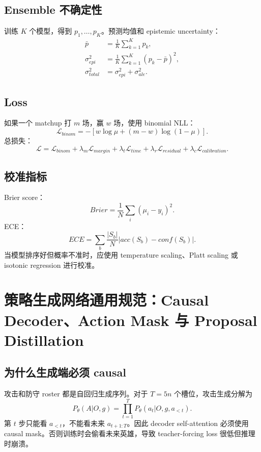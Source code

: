 \documentclass[UTF8,12pt,openany]{ctexbook}
\begin{document}
\section{Ensemble 不确定性}
训练 $K$ 个模型，得到 $p_1,\ldots,p_K$。预测均值和 epistemic uncertainty：
\begin{align}
\bar p&=\frac{1}{K}\sum_{k=1}^{K}p_k,\\
\sigma^2_{epi}&=\frac{1}{K}\sum_{k=1}^{K}(p_k-\bar p)^2,\\
\sigma^2_{total}&=\sigma^2_{epi}+\sigma^2_{ale}.
\end{align}

\section{Loss}
如果一个 matchup 打 $m$ 场，赢 $w$ 场，使用 binomial NLL：
\begin{equation}
\mathcal{L}_{binom}= -[w\log\mu+(m-w)\log(1-\mu)].
\end{equation}
总损失：
\begin{equation}
\mathcal{L}=\mathcal{L}_{binom}+\lambda_m\mathcal{L}_{margin}+\lambda_t\mathcal{L}_{time}+\lambda_r\mathcal{L}_{residual}+\lambda_c\mathcal{L}_{calibration}.
\end{equation}

\section{校准指标}
Brier score：
\begin{equation}
Brier=\frac{1}{N}\sum_i(\mu_i-y_i)^2.
\end{equation}
ECE：
\begin{equation}
ECE=\sum_b\frac{|S_b|}{N}|acc(S_b)-conf(S_b)|.
\end{equation}
当模型排序好但概率不准时，应使用 temperature scaling、Platt scaling 或 isotonic regression 进行校准。


\chapter{策略生成网络通用规范：Causal Decoder、Action Mask 与 Proposal Distillation}

\section{为什么生成端必须 causal}
攻击和防守 roster 都是自回归生成序列。对于 $T=5n$ 个槽位，攻击生成分解为
\begin{equation}
P_\theta(A|O,g)=\prod_{t=1}^{T}P_\theta(a_t|O,g,a_{<t}).
\end{equation}
第 $t$ 步只能看 $a_{<t}$，不能看未来 $a_{t+1:T}$。因此 decoder self-attention 必须使用 causal mask。否则训练时会偷看未来英雄，导致 teacher-forcing loss 很低但推理时崩溃。
\end{document}
